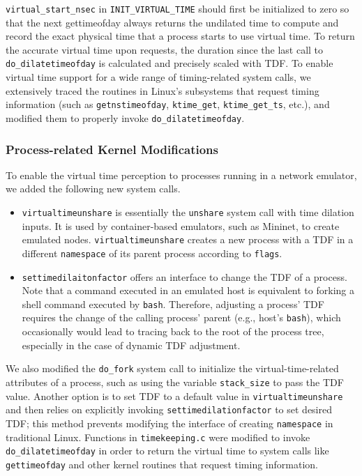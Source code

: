 \texttt{virtual\_start\_nsec} in \texttt{INIT\_VIRTUAL\_TIME} should first be initialized to zero so that the next gettimeofday always returns the undilated time to compute and record the exact physical time that a process starts to use virtual time.
To return the accurate virtual time upon requests, the duration since the last call to \texttt{do\_dilatetimeofday} is calculated and precisely scaled with TDF. 
To enable virtual time support for a wide range of timing-related system calls, we extensively traced the routines in Linux's subsystems that request timing information (such as \texttt{getnstimeofday}, \texttt{ktime\_get}, \texttt{ktime\_get\_ts}, etc.), and modified them to properly invoke \texttt{do\_dilatetimeofday}.


\subsubsection{Process-related Kernel Modifications}
To enable the virtual time perception to processes running in a network emulator, we added the following new system calls.
\begin{itemize}
\item \texttt{virtualtimeunshare} is essentially the \texttt{unshare} system call with time dilation inputs. It is used by container-based emulators, such as Mininet, to create emulated nodes. \texttt{virtualtimeunshare} creates a new process with a TDF in a different \texttt{namespace} of its parent process according to \texttt{flags}.
\item \texttt{settimedilaitonfactor} offers an interface to change the TDF of a process. Note that a command executed in an emulated host is equivalent to forking a shell command executed by \texttt{bash}. 
Therefore, adjusting a process' TDF requires the change of the calling process' parent (e.g., host's \texttt{bash}), which occasionally would lead to tracing back to the root of the process tree, especially in the case of dynamic TDF adjustment. 
\end{itemize}

We also modified the \texttt{do\_fork} system call to initialize the virtual-time-related attributes of a process, such as using the variable \texttt{stack\_size} to pass the TDF value. 
Another option is to set TDF to a default value in \texttt{virtualtimeunshare} and then relies on explicitly invoking \texttt{settimedilationfactor} to set desired TDF; this method prevents modifying the interface of creating \texttt{namespace} in traditional Linux. 
Functions in \texttt{timekeeping.c} were modified to invoke \texttt{do\_dilatetimeofday} in order to return the virtual time to system calls like \texttt{gettimeofday} and other kernel routines that request timing information.


